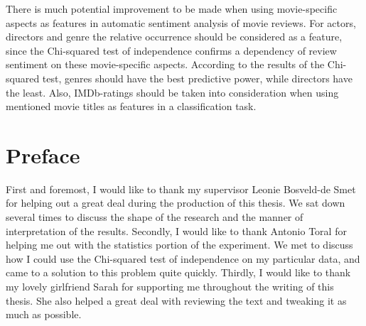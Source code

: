 \documentclass[
10pt, %
a4paper, %
oneside, %
headinclude,footinclude, %
] {book}%
\begin{document}
There is much potential improvement to be made when using movie-specific aspects as features in automatic sentiment analysis of movie reviews. For actors, directors and genre the relative occurrence should be considered as a feature, since the Chi-squared test of independence confirms a dependency of review sentiment on these movie-specific aspects. According to the results of the Chi-squared test, genres should have the best predictive power, while directors have the least. Also, IMDb-ratings should be taken into consideration when using mentioned movie titles as features in a classification task.

\clearpage
\setcounter{tocdepth}{3} %
\tableofcontents %







\chapter*{Preface}

First and foremost, I would like to thank my supervisor Leonie Bosveld-de Smet for helping out a great deal during the production of this thesis. We sat down several times to discuss the shape of the research and the manner of interpretation of the results. Secondly, I would like to thank Antonio Toral for helping me out with the statistics portion of the experiment. We met to discuss how I could use the Chi-squared test of independence on my particular data, and came to a solution to this problem quite quickly. Thirdly, I would like to thank my lovely girlfriend Sarah for supporting me throughout the writing of this thesis. She also helped a great deal with reviewing the text and tweaking it as much as possible. 
\end{document}
